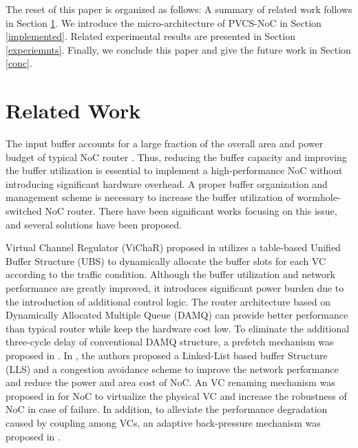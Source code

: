 \documentclass[10pt,conference]{IEEEtran}
\begin{document}
The reset of this paper is organized as follows: A summary of related work follows in Section \ref{related}. We introduce the micro-architecture of PVCS-NoC in Section \ref{implemented}. Related experimental results are presented in Section \ref{experiemnts}. Finally, we conclude this paper and give the future work in Section \ref{conc}.

\section{Related Work}\label{related}
The input buffer accounts for a large fraction of the overall area and power budget of typical NoC router \cite{1650108}\cite{ChPe03}. Thus, reducing the buffer capacity and improving the buffer utilization is essential to implement a high-performance NoC without introducing significant hardware overhead. A proper buffer organization and management scheme is necessary to increase the buffer utilization of wormhole-switched NoC router. There have been significant works focusing on this issue, and several solutions have been proposed.

Virtual Channel Regulator (ViChaR) proposed in \cite{NPKV06} utilizes a table-based Unified Buffer Structure (UBS) to dynamically allocate the buffer slots for each VC according to the traffic condition. Although the buffer utilization and network performance are greatly improved, it introduces significant power burden due to the introduction of additional control logic. The router architecture based on Dynamically Allocated Multiple Queue (DAMQ) \cite{liu2006shared} can provide better performance than typical router while keep the hardware cost low. To eliminate the additional three-cycle delay of conventional DAMQ structure, a prefetch mechanism was proposed in \cite{6310960}. In \cite{4555894}, the authors proposed a Linked-List based buffer Structure (LLS) and a congestion avoidance scheme to improve the network performance and reduce the power and area cost of NoC. An VC renaming mechanism was proposed in \cite{6296442} for NoC to virtualize the physical VC and increase the robustness of NoC in case of failure. In addition, to alleviate the performance degradation caused by coupling among VCs, an adaptive back-pressure mechanism was proposed in \cite{BeckerJMD12}.
\end{document}
